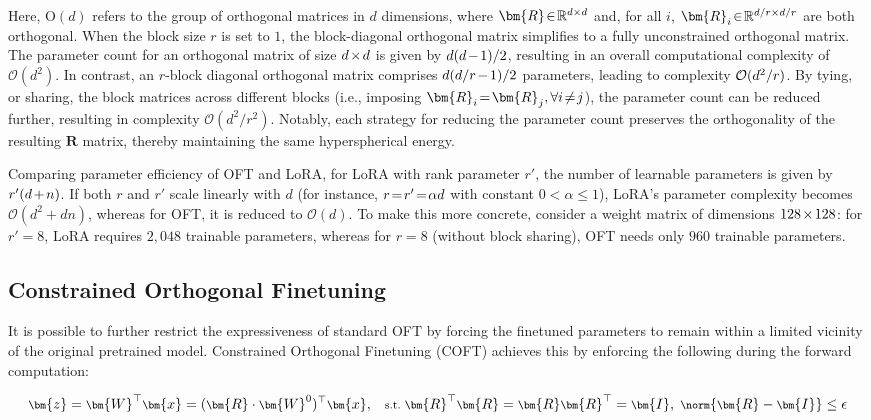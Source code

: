 Here, $\text{O}(d)$ refers to the group of orthogonal matrices in $d$ dimensions, where $\thickmuskip=2mu \medmuskip=2mu \bm{R}\in\mathbb{R}^{d\times d}$ and, for all $i$, $\thickmuskip=2mu \medmuskip=2mu \bm{R}_i\in\mathbb{R}^{d/r\times d/r}$ are both orthogonal. When the block size $r$ is set to $1$, the block-diagonal orthogonal matrix simplifies to a fully unconstrained orthogonal matrix. The parameter count for an orthogonal matrix of size $\thickmuskip=2mu \medmuskip=2mu d\times d$ is given by $\thickmuskip=2mu \medmuskip=2mu d(d-1)/2$, resulting in an overall computational complexity of $\mathcal{O}(d^2)$. In contrast, an $r$-block diagonal orthogonal matrix comprises $\thickmuskip=2mu \medmuskip=2mu d(d/r-1)/2$ parameters, leading to complexity $\thickmuskip=2mu \medmuskip=2mu \mathcal{O}(d^2/r)$. By tying, or sharing, the block matrices across different blocks (i.e., imposing $\thickmuskip=2mu \medmuskip=2mu \bm{R}_i=\bm{R}_j,\forall i\neq j$), the parameter count can be reduced further, resulting in complexity $\mathcal{O}(d^2/r^2)$. Notably, each strategy for reducing the parameter count preserves the orthogonality of the resulting $\bm{R}$ matrix, thereby maintaining the same hyperspherical energy.

Comparing parameter efficiency of OFT and LoRA, for LoRA with rank parameter $r'$, the number of learnable parameters is given by $\thickmuskip=2mu \medmuskip=2mu r'(d+n)$. If both $r$ and $r'$ scale linearly with $d$ (for instance, $\thickmuskip=2mu \medmuskip=2mu r=r'=\alpha d$ with constant $0<\alpha\leq 1$), LoRA’s parameter complexity becomes $\mathcal{O}(d^2+dn)$, whereas for OFT, it is reduced to $\mathcal{O}(d)$. To make this more concrete, consider a weight matrix of dimensions $\thickmuskip=2mu \medmuskip=2mu 128\times 128$: for $r'=8$, LoRA requires $2,048$ trainable parameters, whereas for $r=8$ (without block sharing), OFT needs only $960$ trainable parameters.

\subsection{Constrained Orthogonal Finetuning}

It is possible to further restrict the expressiveness of standard OFT by forcing the finetuned parameters to remain within a limited vicinity of the original pretrained model. Constrained Orthogonal Finetuning (COFT) achieves this by enforcing the following during the forward computation:

\begin{equation}\label{eq:coft_general}
    \footnotesize
    \bm{z}=\bm{W}^\top\bm{x}=(\bm{R}\cdot\bm{W}^0)^\top\bm{x},~~~\text{s.t.}~\bm{R}^\top\bm{R}=\bm{R}\bm{R}^\top=\bm{I},~\norm{\bm{R}-\bm{I}}\leq \epsilon
\end{equation}

